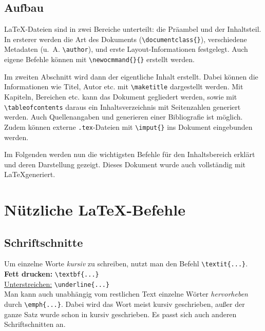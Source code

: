 \documentclass[ngerman]{scrreport}
\begin{document}
\section{Aufbau}

\LaTeX-Dateien sind in zwei Bereiche unterteilt: die Präambel und der Inhaltsteil. In ersterer werden die Art des Dokuments ({\color{blue}\verb|\documentclass{}|}), verschiedene Metadaten (u.~A. {\color{blue}\verb|\author|}), und erste Layout-Informationen festgelegt.
Auch eigene Befehle können mit {\color{blue}\verb|\newocmmand{}{}|} erstellt werden.

Im zweiten Abschnitt wird dann der eigentliche Inhalt erstellt. Dabei können die Informationen wie Titel, Autor etc. mit {\color{blue}\verb|\maketitle|} dargestellt werden. Mit Kapiteln, Bereichen etc. kann das Dokument gegliedert werden, sowie mit {\color{blue}\verb|\tableofcontents|} daraus ein Inhaltsverzeichnis mit Seitenzahlen generiert werden.
Auch Quellenangaben und generieren einer Bibliografie ist möglich. Zudem können externe \texttt{.tex}-Dateien mit {\color{blue}\verb|\imput{}|} ins Dokument eingebunden werden.

Im Folgenden werden nun die wichtigsten Befehle für den Inhaltsbereich erklärt und deren Darstellung gezeigt. Dieses Dokument wurde auch vollständig mit \LaTeX generiert.

\chapter{\centering Nützliche \LaTeX{}-Befehle}

\section{Schriftschnitte}
Um einzelne Worte \textit{kursiv} zu schreiben, nutzt man den Befehl {\color{blue}\verb|\textit{...}|}.\\
\textbf{Fett drucken:} {\color{blue}\verb|\textbf{...}|}\\
\underline{Unterstreichen:} {\color{blue}\verb|\underline{...}|}\\
Man kann auch unabhängig vom restlichen Text einzelne Wörter \emph{hervorheben} durch {\color{blue}\verb|\emph{...}|}. Dabei wird das Wort meist kursiv geschrieben, außer der ganze Satz wurde schon in kursiv geschrieben. Es passt sich auch anderen Schriftschnitten an.
\end{document}
